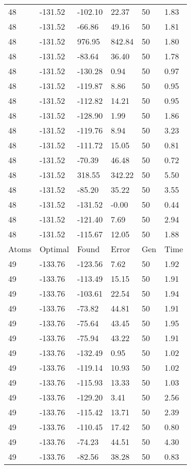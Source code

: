 \documentclass{report}
\begin{document}
\begin{appendix}
\begin{longtable}{llllll}
48 & -131.52 & -102.10 & 22.37 & 50 & 1.83 \\
48 & -131.52 & -66.86 & 49.16 & 50 & 1.81 \\
48 & -131.52 & 976.95 & 842.84 & 50 & 1.80 \\
48 & -131.52 & -83.64 & 36.40 & 50 & 1.78 \\
48 & -131.52 & -130.28 & 0.94 & 50 & 0.97 \\
48 & -131.52 & -119.87 & 8.86 & 50 & 0.95 \\
48 & -131.52 & -112.82 & 14.21 & 50 & 0.95 \\
48 & -131.52 & -128.90 & 1.99 & 50 & 1.86 \\
48 & -131.52 & -119.76 & 8.94 & 50 & 3.23 \\
48 & -131.52 & -111.72 & 15.05 & 50 & 0.81 \\
48 & -131.52 & -70.39 & 46.48 & 50 & 0.72 \\
48 & -131.52 & 318.55 & 342.22 & 50 & 5.50 \\
48 & -131.52 & -85.20 & 35.22 & 50 & 3.55 \\
48 & -131.52 & -131.52 & -0.00 & 50 & 0.44 \\
48 & -131.52 & -121.40 & 7.69 & 50 & 2.94 \\
48 & -131.52 & -115.67 & 12.05 & 50 & 1.88 \\
Atoms & Optimal & Found & Error & Gen & Time \\
49 & -133.76 & -123.56 & 7.62 & 50 & 1.92 \\
49 & -133.76 & -113.49 & 15.15 & 50 & 1.91 \\
49 & -133.76 & -103.61 & 22.54 & 50 & 1.94 \\
49 & -133.76 & -73.82 & 44.81 & 50 & 1.91 \\
49 & -133.76 & -75.64 & 43.45 & 50 & 1.95 \\
49 & -133.76 & -75.94 & 43.22 & 50 & 1.91 \\
49 & -133.76 & -132.49 & 0.95 & 50 & 1.02 \\
49 & -133.76 & -119.14 & 10.93 & 50 & 1.02 \\
49 & -133.76 & -115.93 & 13.33 & 50 & 1.03 \\
49 & -133.76 & -129.20 & 3.41 & 50 & 2.56 \\
49 & -133.76 & -115.42 & 13.71 & 50 & 2.39 \\
49 & -133.76 & -110.45 & 17.42 & 50 & 0.80 \\
49 & -133.76 & -74.23 & 44.51 & 50 & 4.30 \\
49 & -133.76 & -82.56 & 38.28 & 50 & 0.83 \\

\end{longtable}
\end{appendix}
\end{document}
